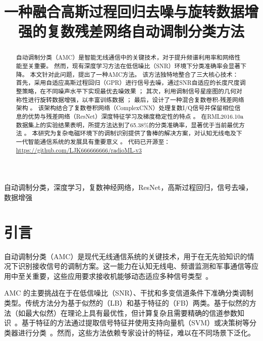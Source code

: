 \documentclass[conference]{IEEEtran}
\begin{document}
\title{一种融合高斯过程回归去噪与旋转数据增强的复数残差网络自动调制分类方法}

\author{
}

\maketitle

\begin{abstract}
自动调制分类（AMC）是智能无线通信中的关键技术，对于提升频谱利用率和网络性能至关重要。
然而，现有深度学习方法在低信噪比（SNR）环境下分类准确率会显著下降。
本文针对此问题，提出了一种AMC方法。
该方法独特地整合了三大核心技术：
首先，采用自适应高斯过程回归（GPR）进行信号去噪，通过SNR自适应的长度尺度调整策略，在不同噪声水平下实现最优去噪效果 ；
其次，利用调制信号星座图的几何对称性进行旋转数据增强，以丰富训练数据 ；
最后，设计了一种混合复数卷积-残差网络架构 。
该架构结合了复数卷积网络（ComplexCNN）处理复数I/Q信号并保留相位信息的优势与残差网络（ResNet）深度特征学习及梯度稳定性的特点 。
在RML2016.10a数据集上的实验结果表明，所提方法达到了65.38\%的分类准确率，显著优于当前最优方法 。
本研究为复杂电磁环境下的调制识别提供了鲁棒的解决方案，对认知无线电及下一代智能通信系统的发展具有重要意义 。
代码已开源至：\url{https://github.com/LJK666666666/radioML-v3}
\end{abstract}

\begin{IEEEkeywords}
自动调制分类，深度学习，复数神经网络，ResNet，高斯过程回归，信号去噪，数据增强
\end{IEEEkeywords}


\section{引言}
自动调制分类（AMC）是现代无线通信系统的关键技术，用于在无先验知识的情况下识别接收信号的调制方案。这一能力在认知无线电、频谱监测和军事通信等应用中至关重要，这些应用要求接收机能够动态适应多种信号类型~\cite{dobre2007survey}。

AMC 的主要挑战在于在低信噪比（SNR）、干扰和多变信道条件下准确分类调制类型。传统方法分为基于似然的（LB）和基于特征的（FB）两类。基于似然的方法（如最大似然）在理论上具有最优性，但计算复杂且需要精确的信道参数知识~\cite{hameed2009likelihood}。基于特征的方法通过提取信号特征并使用支持向量机（SVM）或决策树等分类器进行分类~\cite{hazza2013overview}。然而，这些方法依赖专家设计的特征，难以在不同场景下泛化。
\end{document}
